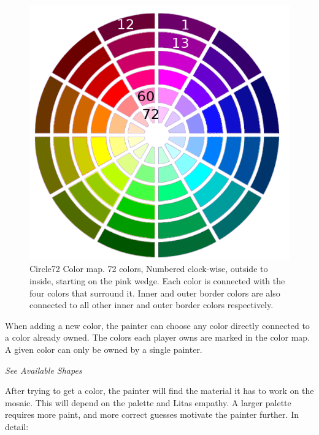\documentclass[twocolumn]{article}
\newcommand{\sublvl}[1]{\vspace{0.3cm}\large{\textit{#1}}\vspace{0.1cm}}
\begin{document}
\begin{figure}[b!]
\centering
\includegraphics[scale=0.65]{map_1_numbered.png}
\caption{Circle72 Color map. 72 colors, Numbered clock-wise, outside to inside, starting on the pink wedge. Each color is connected with the four colors that surround it. Inner and outer border colors are also connected to all other inner and outer border colors respectively.}
\label{fig:color_map}
\end{figure}

When adding a new color, the painter can choose any color directly connected to a color already owned. The colors each player owns are marked in the color map. A given color can only be owned by a single painter.


\sublvl{See Available Shapes}

After trying to get a color, the painter will find the material it has to work on the mosaic. This will depend on the palette and Litas empathy. A larger palette requires more paint, and more correct guesses motivate the painter further. In detail: 
\end{document}

